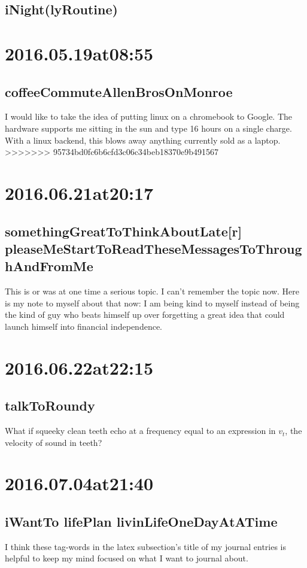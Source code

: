 \subsection*{iNight(lyRoutine)}

\section*{ 2016.05.19at08:55 }
\subsection*{coffeeCommuteAllenBrosOnMonroe}
I would like to take the idea of putting linux on a chromebook to Google. The hardware supports me sitting in the sun and type 16 hours on a single charge. With a linux backend, this blows away anything currently sold as a laptop.
>>>>>>> 95734bd0fc6b6cfd3c06c34beb18370e9b491567

\section*{ 2016.06.21at20:17 }
\subsection*{ somethingGreatToThinkAboutLate[r] pleaseMeStartToReadTheseMessagesToThroughAndFromMe }
This is or was at one time a serious topic. I can't remember the topic now. Here is my note to myself about that now: I am being kind to myself instead of being the kind of guy who beats himself up over forgetting a great idea that could launch himself into financial independence.



\section*{ 2016.06.22at22:15 }
\subsection*{ talkToRoundy }
What if squeeky clean teeth echo at a frequency equal to an expression in $v_t$, the velocity of sound in teeth?

\section*{ 2016.07.04at21:40 }
\subsection*{ iWantTo lifePlan livinLifeOneDayAtATime }
I think these tag-words in the latex subsection's title of my journal entries is helpful to keep my mind focused on what I want to journal about. 

